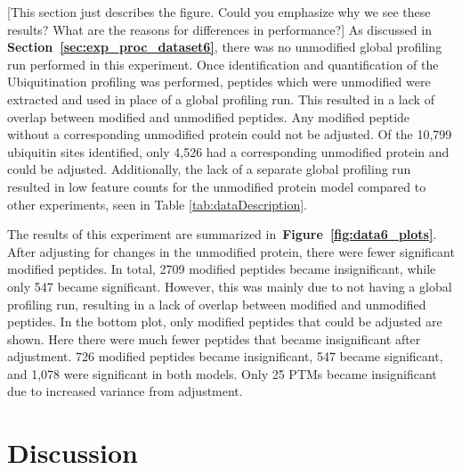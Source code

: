 \documentclass[mcp]{article}
\numberwithin{table}{section}
\def\todo#1{{\color{red}[#1]}}
\def\figref#1{{\bf Figure~\ref{fig:#1}}}
\def\secref#1{{\bf Section~\ref{sec:#1}}}
\begin{document}
\todo{This section just describes the figure. Could you emphasize why we see these results? What are the reasons for differences in performance?}  As discussed in \secref{exp_proc_dataset6}, there was no unmodified global profiling run performed in this experiment. Once identification and quantification of the Ubiquitination profiling was performed, peptides which were unmodified were extracted and used in place of a global profiling run. This resulted in a lack of overlap between modified and unmodified peptides. Any modified peptide without a corresponding unmodified protein could not be adjusted. Of the 10,799 ubiquitin sites identified, only 4,526 had a corresponding unmodified protein and could be adjusted. Additionally, the lack of a separate global profiling run resulted in low feature counts for the unmodified protein model compared to other experiments, seen in Table \ref{tab:dataDescription}.

The results of this experiment are summarized in~\figref{data6_plots}. After adjusting for changes in the unmodified protein, there were fewer significant modified peptides. In total, 2709 modified peptides became insignificant, while only 547 became significant. However, this was mainly due to not having a global profiling run, resulting in a lack of overlap between modified and unmodified peptides. In the bottom plot, only modified peptides that could be adjusted are shown. Here there were much fewer peptides that became insignificant after adjustment. 726 modified peptides became insignificant, 547 became significant, and 1,078 were significant in both models. Only 25 PTMs became insignificant due to increased variance from adjustment.


\section{Discussion}
\end{document}
